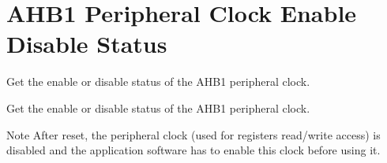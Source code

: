 \hypertarget{group___r_c_c_ex___a_h_b1___peripheral___clock___enable___disable___status}{}\section{A\+H\+B1 Peripheral Clock Enable Disable Status}
\label{group___r_c_c_ex___a_h_b1___peripheral___clock___enable___disable___status}


Get the enable or disable status of the A\+H\+B1 peripheral clock.  


Get the enable or disable status of the A\+H\+B1 peripheral clock. 

\begin{DoxyNote}{Note}
After reset, the peripheral clock (used for registers read/write access) is disabled and the application software has to enable this clock before using it. 
\end{DoxyNote}
